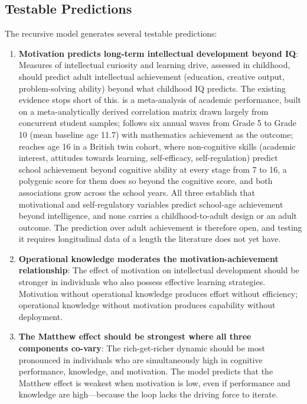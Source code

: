 \documentclass[12pt,a4paper]{article}
\begin{document}
\subsection{Testable Predictions}

The recursive model generates several testable predictions:

\begin{enumerate}
\item \textbf{Motivation predicts long-term intellectual development beyond IQ}: Measures of intellectual curiosity and learning drive, assessed in childhood, should predict adult intellectual achievement (education, creative output, problem-solving ability) beyond what childhood IQ predicts. The existing evidence stops short of this.  is a meta-analysis of academic performance, built on a meta-analytically derived correlation matrix drawn largely from concurrent student samples; \citet{Murayama2013} follows six annual waves from Grade 5 to Grade 10 (mean baseline age 11.7) with mathematics achievement as the outcome; \citet{Malanchini2024} reaches age 16 in a British twin cohort, where non-cognitive skills (academic interest, attitudes towards learning, self-efficacy, self-regulation) predict school achievement beyond cognitive ability at every stage from 7 to 16, a polygenic score for them does so beyond the cognitive score, and both associations grow across the school years. All three establish that motivational and self-regulatory variables predict school-age achievement beyond intelligence, and none carries a childhood-to-adult design or an adult outcome. The prediction over adult achievement is therefore open, and testing it requires longitudinal data of a length the literature does not yet have.

\item \textbf{Operational knowledge moderates the motivation-achievement relationship}: The effect of motivation on intellectual development should be stronger in individuals who also possess effective learning strategies. Motivation without operational knowledge produces effort without efficiency; operational knowledge without motivation produces capability without deployment.

\item \textbf{The Matthew effect should be strongest where all three components co-vary}: The rich-get-richer dynamic should be most pronounced in individuals who are simultaneously high in cognitive performance, knowledge, and motivation. The model predicts that the Matthew effect is weakest when motivation is low, even if performance and knowledge are high---\hspace{0pt}because the loop lacks the driving force to iterate.


\end{enumerate}
\end{document}
